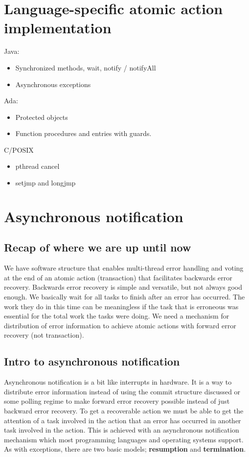 \section{Language-specific atomic action implementation}
Java:
\begin{itemize}
\item Synchronized methods, wait, notify / notifyAll
\item Asynchronous exceptions
\end{itemize}
Ada:
\begin{itemize}
\item Protected objects
\item Function procedures and entries with guards.
\end{itemize}
C/POSIX
\begin{itemize}
\item pthread cancel
\item setjmp and longjmp
\end{itemize}

\section{Asynchronous notification}
\subsection{Recap of where we are up until now}
We have software structure that enables multi-thread error handling and voting at the end of an atomic action (transaction) that facilitates backwards error recovery. Backwards error recovery is simple and versatile, but not always good enough. We basically wait for all tasks to finish after an error has occurred. The work they do in this time can be meaningless if the task that is erroneous was essential for the total work the tasks were doing. We need a mechanism for distribution of error information to achieve atomic actions with forward error recovery (not transaction). 

\subsection{Intro to asynchronous notification}
Asynchronous notification is a bit like interrupts in hardware. It is a way to distribute error information instead of using the commit structure discussed or some polling regime to make forward error recovery possible instead of just backward error recovery. To get a recoverable action we must be able to get the attention of a task involved in the action that an error has occurred in another task involved in the action. This is achieved with an asynchronous notification mechanism which most programming languages and operating systems support. As with exceptions, there are two basic models; \textbf{resumption} and \textbf{termination}. 

